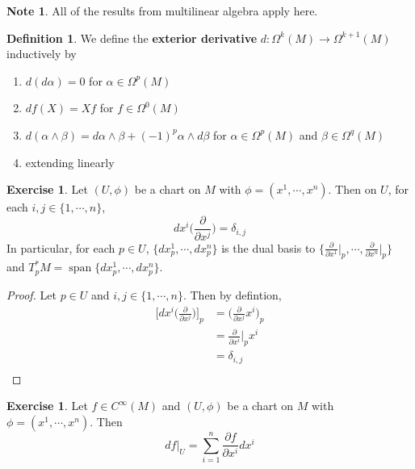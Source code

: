 \documentclass{book}
\theoremstyle{definition}
\newtheorem{defn}[definition]{Definition}
\newtheorem{note}[definition]{Note}
\newtheorem{ex}[definition]{Exercise}
\newcommand{\al}{\alpha}
\newcommand{\be}{\beta}
\newcommand{\del}{\delta}
\newcommand{\Om}{\Omega}
\DeclareMathOperator{\spn}{span}
\DeclareMathOperator*{\0}{\mbf{0}}
\DeclareMathOperator*{\1}{\mbf{1}}
\newcommand{\tbf}[1]{\textbf{#1}}
\newcommand{\p}{\partial}
\begin{document}
	\begin{note}
		All of the results from multilinear algebra apply here.
	\end{note}

	\begin{defn}
		We define the \tbf{exterior derivative} $d: \Om^k(M) \rightarrow \Om^{k+1}(M)$ inductively by 
		\begin{enumerate}
			\item $d(d \al) = 0$ for $\al \in \Om^p(M)$
			\item $df(X) = Xf$ for $f \in \Om^0(M)$
			\item $d(\al \wedge \be) = d\al \wedge \be + (-1)^p \al \wedge d\be$ for $\al \in \Om^p(M)$ and $\be \in \Om^q(M)$
			\item extending linearly
		\end{enumerate}
	\end{defn}

	\begin{ex}
		Let $(U, \phi)$ be a chart on $M$ with $\phi = (x^1, \cdots, x^n)$. Then on $U$, for each $i,j \in \{1, \cdots, n\}$, $$dx^i\bigg(\frac{\p}{\p x^j} \bigg) = \del_{i,j}$$ 
		In particular, for each $p \in U$, $\{dx^1_p, \cdots, dx^n_p \}$ is the dual basis to $\bigg \{ \frac{\p}{\p x^1} \bigg|_p, \cdots, \frac{\p}{\p x^n} \bigg|_p \bigg \}$ and $T_p^*M = \spn\{dx^1_p, \cdots, dx^n_p\}$.
	\end{ex}

	\begin{proof}
		Let $p \in U$ and $i,j \in \{1, \cdots, n\}$. Then  by defintion,
		\begin{align*}
			\bigg[ dx^i \bigg (\frac{\p}{\p x^j} \bigg ) \bigg]_p 
			&= \bigg(\frac{\p}{\p x^j} x^i \bigg )_p \\
			&= \frac{\p}{\p x^i} \bigg|_p x^i \\
			&= \del_{i,j} \\
		\end{align*}
	\end{proof}

	\begin{ex}
		Let $f \in C^{\infty}(M)$ and $(U, \phi)$ be a chart on $M$ with $\phi = (x^1, \cdots, x^n)$. Then $$df|_U = \sum_{i=1}^n \frac{\p f}{\p x^i} dx^i$$
	\end{ex}
\end{document}
